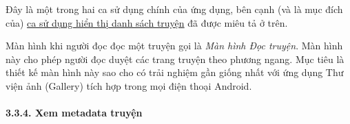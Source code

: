 Đây là một trong hai ca sử dụng chính của ứng dụng, bên cạnh (và là mục
đích của) \protect\hyperlink{P3.3.2-show-library}{ca sử dụng hiển thị
  danh sách truyện} đã được miêu tả ở trên.

Màn hình khi người đọc đọc một truyện gọi là \emph{Màn hình Đọc truyện}.
Màn hình này cho phép người đọc duyệt các trang truyện theo phương
ngang. Mục tiêu là thiết kế màn hình này sao cho có trải nghiệm gần
giống nhất với ứng dụng Thư viện ảnh (Gallery) tích hợp trong mọi điện
thoại Android.

\hypertarget{xem-metadata-truyux1ec7n}{%
  \paragraph{\texorpdfstring{3.3.4. Xem metadata truyện
    }{3.3.4. Xem metadata truyện }}\label{xem-metadata-truyux1ec7n}}

